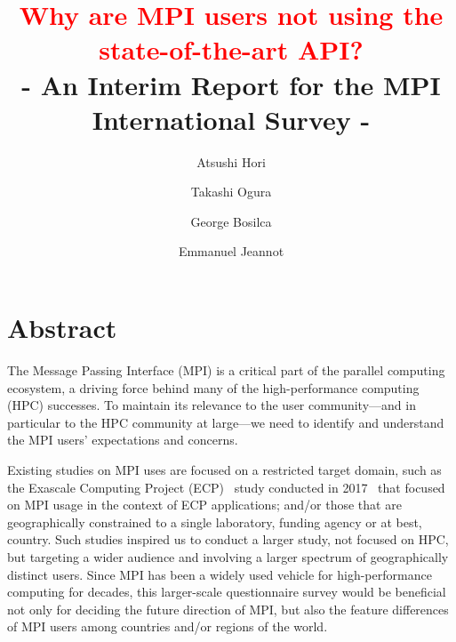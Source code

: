 \documentclass[sigconf,nonacm]{acmart}
\begin{document}
\title{\textcolor{red}{Why are MPI users not using the state-of-the-art API?}\\
- An Interim Report for the MPI International Survey -}


\author{Atsushi Hori}
\author{Takashi Ogura}

\author{George Bosilca}

\author{Emmanuel Jeannot}

\maketitle

\section{Abstract}

The Message Passing Interface (MPI) is a critical part of the parallel computing
ecosystem, a driving force behind many of the high-performance computing (HPC) successes.
To maintain its relevance to the user community---and in particular to the HPC
community at large---we need to identify and understand the MPI users' expectations and concerns. 

%
Existing studies on MPI uses are focused on a restricted target domain,
such as the Exascale Computing Project (ECP)~\cite{ECP} study conducted in 2017~\cite{osti_1462877} that focused
on MPI usage in the context of ECP applications; and/or those that are geographically
constrained to a single laboratory, funding agency or at best, country.
%
Such studies inspired us to conduct a larger study, not focused on HPC, but
targeting a wider audience and involving a larger spectrum of geographically
distinct users. Since MPI has been a widely used vehicle for high-performance
computing for decades, this larger-scale questionnaire survey would be
beneficial not only for deciding the future direction of MPI, but also the
feature differences of MPI users among countries and/or regions of the world.
\end{document}
